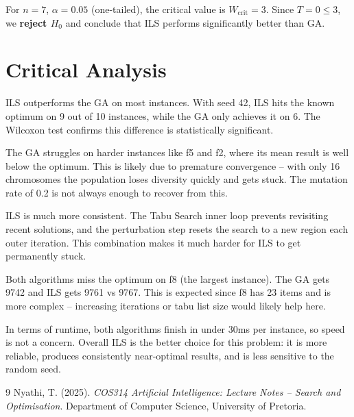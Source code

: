 \documentclass[12pt, a4paper]{article}
\begin{document}
For $n = 7$, $\alpha = 0.05$ (one-tailed), the critical value is $W_{\text{crit}} = 3$. Since $T = 0 \leq 3$, we \textbf{reject $H_0$} and conclude that ILS performs significantly better than GA.

\section{Critical Analysis}

ILS outperforms the GA on most instances. With seed 42, ILS hits the known optimum on 9 out of 10 instances, while the GA only achieves it on 6. The Wilcoxon test confirms this difference is statistically significant.

The GA struggles on harder instances like f5 and f2, where its mean result is well below the optimum. This is likely due to premature convergence -- with only 16 chromosomes the population loses diversity quickly and gets stuck. The mutation rate of 0.2 is not always enough to recover from this.

ILS is much more consistent. The Tabu Search inner loop prevents revisiting recent solutions, and the perturbation step resets the search to a new region each outer iteration. This combination makes it much harder for ILS to get permanently stuck.

Both algorithms miss the optimum on f8 (the largest instance). The GA gets 9742 and ILS gets 9761 vs 9767. This is expected since f8 has 23 items and is more complex -- increasing iterations or tabu list size would likely help here.

In terms of runtime, both algorithms finish in under 30ms per instance, so speed is not a concern. Overall ILS is the better choice for this problem: it is more reliable, produces consistently near-optimal results, and is less sensitive to the random seed.

\begin{thebibliography}{9}
Nyathi, T. (2025). \textit{COS314 Artificial Intelligence: Lecture Notes -- Search and Optimisation}. Department of Computer Science, University of Pretoria.
\end{thebibliography}
\end{document}
